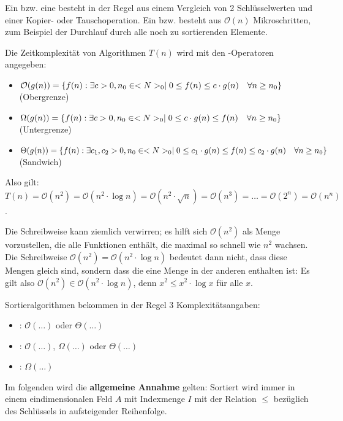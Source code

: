 Ein  bzw. eine  besteht in der Regel aus einem Vergleich von 2 Schlüsselwerten und einer Kopier- oder Tauschoperation. Ein  bzw.  besteht aus $\mathcal{O}(n)$ Mikroschritten, zum Beispiel der Durchlauf durch alle noch zu sortierenden Elemente.

Die Zeitkomplexität von Algorithmen $T(n)$ wird mit den -Operatoren angegeben:
\begin{itemize}
	\item $\mathcal{O}(g(n))=\{f(n):\exists c>0, n_0\in<N>_0\mid 0\le f(n)\le c\cdot g(n)\quad\forall n\ge n_0\}$ (Obergrenze)
	\item $\Omega(g(n)) = \{f(n):\exists c>0, n_0\in<N>_0\mid 0\le c\cdot g(n)\le f(n)\quad\forall n\ge n_0\}$ (Untergrenze)
	\item $\Theta(g(n)) = \{f(n):\exists c_1,c_2>0,n_0\in<N>_0\mid 0\le c_1\cdot g(n)\le f(n)\le c_2\cdot g(n)\quad\forall n\ge n_0\}$ (Sandwich)
\end{itemize}

Also gilt: $T(n) = \mathcal{O}(n^2) = \mathcal{O}(n^2\cdot\log n) = \mathcal{O}(n^2\cdot\sqrt{n}) = \mathcal{O}(n^3) = \dots = \mathcal{O}(2^n) = \mathcal{O}(n^n)$.

\begin{*anmerkung}
	Die Schreibweise kann ziemlich verwirren; es hilft sich $\mathcal{O}(n^2)$ als Menge vorzustellen, die alle Funktionen enthält, die maximal so schnell wie $n^2$ wachsen. Die Schreibweise $\mathcal{O}(n^2)=\mathcal{O}(n^2\cdot\log n)$ bedeutet dann nicht, dass diese Mengen gleich sind, sondern dass die eine Menge in der anderen enthalten ist: Es gilt also $\mathcal{O}(n^2)\in\mathcal{O}(n^2\cdot\log n)$, denn $x^2 \le x^2\cdot\log x$ für alle $x$.
\end{*anmerkung}

Sortieralgorithmen bekommen in der Regel 3 Komplexitätsangaben:
\begin{itemize}
	\item {}: $\mathcal{O}(\dots)$ oder $\Theta(\dots)$
	\item {}: $\mathcal{O}(\dots)$, $\Omega(\dots)$ oder $\Theta(\dots)$
	\item {}: $\Omega(\dots)$
\end{itemize}

Im folgenden wird die \textbf{allgemeine Annahme} gelten: Sortiert wird immer in einem eindimensionalen Feld $A$ mit Indexmenge $I$ mit der Relation $\le$ bezüglich des Schlüssels in aufsteigender Reihenfolge.

